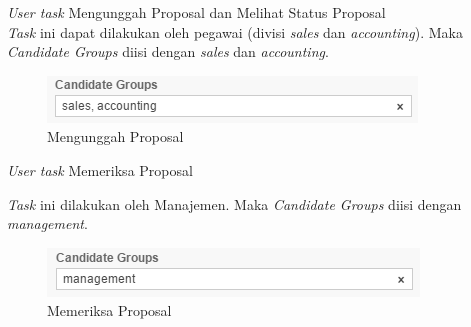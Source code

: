 \begin{description}
	\item \textit{User task} Mengunggah Proposal dan Melihat Status Proposal\\
  \textit{Task} ini dapat dilakukan oleh pegawai (divisi \textit{sales} dan \textit{accounting}). Maka \textit{Candidate Groups} diisi dengan \textit{sales} dan \textit{accounting}.
		\begin{figure}[H]
			\centering
			\includegraphics[scale=1]{Gambar/Bab-3/Kasus1/1group}
			\caption{Mengunggah Proposal} 
			\label{fig:pengajuanproposalmengunggahproposal_group}
	\end{figure}
	
	
	\item \textit{User task} Memeriksa Proposal
	
	 \textit{Task} ini dilakukan oleh Manajemen. Maka \textit{Candidate Groups} diisi dengan \textit{management}.
		\begin{figure}[H]
			\centering
			\includegraphics[scale=1]{Gambar/Bab-3/Kasus1/3group2}
			\caption{Memeriksa Proposal} 
			\label{fig:pengajuanproposal_memeriksaproposal_group}
	\end{figure}
	


\end{description}


